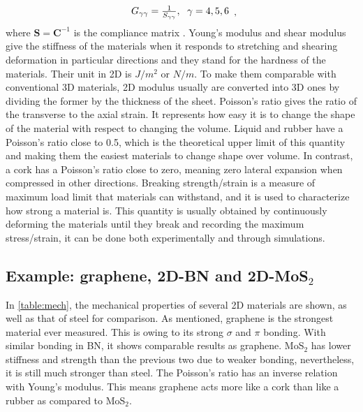 \begin{equation}
\begin{array}{c}
G_{\gamma\gamma}=\frac{1}{S_{\gamma\gamma}} ,\hspace{6 pt} \gamma = 4, 5, 6
\end{array},
\end{equation}
where $\boldsymbol{S}=\boldsymbol{C}^{-1}$ is the compliance matrix \citep[e.g.][]{nye1985physical}. Young's modulus and shear modulus give the stiffness of the materials when it responds to stretching and shearing deformation in particular directions and they stand for the hardness of the materials. Their unit in 2D is $J/m^2$ or $N/m$. To make them comparable with conventional 3D materials, 2D modulus usually are converted into 3D ones by dividing the former by the thickness of the sheet. Poisson's ratio gives the ratio of the transverse to the axial strain. It represents how easy it is to change the shape of the material with respect to changing the volume. Liquid and rubber have a Poisson's ratio close to 0.5, which is the theoretical upper limit of this quantity and making them the easiest materials to change shape over volume. In contrast, a cork has a Poisson's ratio close to zero, meaning zero lateral expansion when compressed in other directions. Breaking strength/strain is a measure of maximum load limit that materials can withstand, and it is used to characterize how strong a material is. This quantity is usually obtained by continuously deforming the materials until they break and recording the maximum stress/strain, it can be done both experimentally and through simulations. 

\subsection{Example: graphene, 2D-BN and 2D-MoS$_2$}

In \autoref{table:mech}, the mechanical properties of several 2D materials are shown, as well as that of steel for comparison.  As mentioned, graphene is the strongest material ever measured. This is owing to its strong $\sigma$ and $\pi$ bonding. With similar bonding in BN, it shows comparable results as graphene. MoS$_2$ has lower stiffness and strength than the previous two due to weaker bonding, nevertheless, it is still much stronger than steel. The Poisson's ratio has an inverse relation with Young's modulus. This means graphene acts more like a cork than like a rubber as compared to MoS$_2$. 

